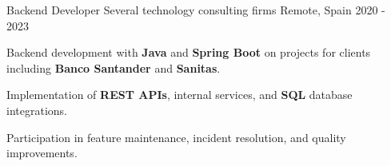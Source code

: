   \cventry
    {Backend Developer}
    {Several technology consulting firms}
  {Remote, Spain}
  {2020 - 2023}
  {
    \begin{cvitems}
      \item {Backend development with \textbf{Java} and \textbf{Spring Boot} on projects for clients including \textbf{Banco Santander} and \textbf{Sanitas}.}
      \item {Implementation of \textbf{REST APIs}, internal services, and \textbf{SQL} database integrations.}
      \item {Participation in feature maintenance, incident resolution, and quality improvements.}
    \end{cvitems}
  }
